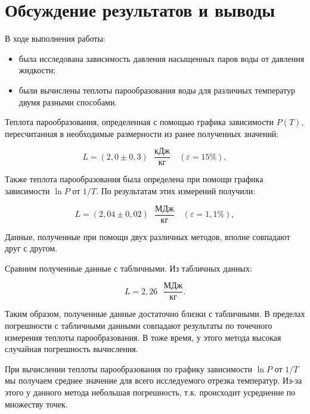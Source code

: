 \documentclass[12pt,a4paper]{article}
\begin{document}
\section{Обсуждение результатов и выводы}
\label{res}

В ходе выполнения работы:

\begin{itemize}
	\item была исследована зависимость давления насыщенных паров воды от давления жидкости;
	\item были вычислены теплоты парообразования воды для различных температур двумя разными способами.
\end{itemize}

Теплота парообразования, определенная с помощью графика зависимости $P(T)$, пересчитанная в необходимые размерности из ранее полученных значений:


\[ \boxed{L = \left(2,0 \pm 0,3\right) \text{ } \frac{\text{кДж}}{\text{кг}} \quad (\varepsilon = 15 \%),} \]


Также теплота парообразования была определена при помощи графика зависимости $ \ln P $ от $ 1/T $. По результатам этих измерений получили:

\[ \boxed{L = \left(2,04 \pm 0,02\right) \text{ } \frac{\text{МДж}}{\text{кг}} \quad (\varepsilon = 1,1 \%),} \]


Данные, полученные при помощи двух различных методов, вполне совпадают друг с другом.

Сравним полученные данные с табличными. Из табличных данных:

\[ L = 2,26 \text{ } \frac{\text{МДж}}{\text{кг}}. \]

Таким образом, полученные данные достаточно близки с табличными. В пределах погрешности с табличными данными совпадают результаты по точечного измерения теплоты парообразования. В тоже время, у этого метода высокая случайная погрешность вычисления.

При вычислении теплоты парообразования по графику зависимости $ \ln P $ от $ 1/T $ мы получаем среднее значение для всего исследуемого отрезка температур. Из-за этого у данного метода небольшая погрешность, т.к. происходит усреднение по множеству точек.
\end{document}
